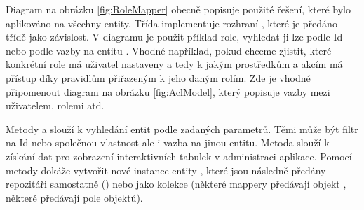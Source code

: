 
Diagram na obrázku \ref{fig:RoleMapper} obecně popisuje použité řešení, které bylo aplikováno na všechny entity. Třída  implementuje rozhraní , které je předáno třídě  jako závislost. V diagramu je použit příklad role, vyhledat ji lze podle Id nebo podle vazby na entitu . Vhodné například, pokud chceme zjistit, které konkrétní role má uživatel nastaveny a tedy k jakým prostředkům a akcím má přístup díky pravidlům přiřazeným k jeho daným rolím. Zde je vhodné připomenout diagram na obrázku \ref{fig:AclModel}, který popisuje vazby mezi uživatelem, rolemi atd.

Metody  a  slouží k vyhledání entit podle zadaných parametrů. Těmi může být filtr na Id nebo společnou vlastnost ale i vazba na jinou entitu. Metoda  slouží k získání dat pro zobrazení interaktivních tabulek v administraci aplikace. Pomocí metody  dokáže vytvořit nové instance entity , které jsou následně předány repozitáři samostatně () nebo jako kolekce (některé mappery předávají objekt , některé předávají pole objektů).